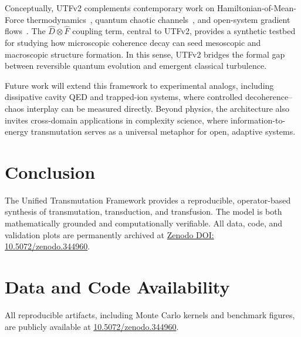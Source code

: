 \documentclass[12pt]{article}
\begin{document}
Conceptually, UTFv2 complements contemporary work on
Hamiltonian-of-Mean-Force thermodynamics~\cite{Pathania2024Quantum},
quantum chaotic channels~\cite{MatsoukasRoubeas2024Quantum},
and open-system gradient flows~\cite{PRResearchForceCurrent2023}.
The $\hat{D}\otimes\hat{F}$ coupling term, central to UTFv2, provides
a synthetic testbed for studying how microscopic coherence decay can seed
mesoscopic and macroscopic structure formation.
In this sense, UTFv2 bridges the formal gap between reversible
quantum evolution and emergent classical turbulence.

Future work will extend this framework to experimental analogs,
including dissipative cavity QED and trapped-ion systems, where
controlled decoherence–chaos interplay can be measured directly.
Beyond physics, the architecture also invites cross-domain applications
in complexity science, where information-to-energy transmutation
serves as a universal metaphor for open, adaptive systems.



\section{Conclusion}
The Unified Transmutation Framework provides a reproducible,
operator-based synthesis of transmutation, transduction, and transfusion.
The model is both mathematically grounded and computationally verifiable.
All data, code, and validation plots are permanently archived at
\href{https://doi.org/10.5072/zenodo.344960}{Zenodo DOI: 10.5072/zenodo.344960}.

\section*{Data and Code Availability}
All reproducible artifacts, including Monte Carlo kernels and benchmark figures,
are publicly available at
\href{https://doi.org/10.5072/zenodo.344960}{10.5072/zenodo.344960}.




\end{document}
